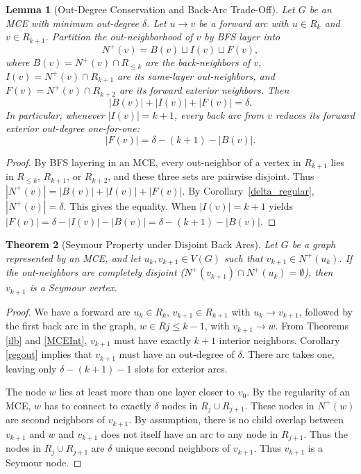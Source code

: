 \documentclass[AMS, Times1COL]{article} %
\newtheorem{theorem}{Theorem}[section]
\newtheorem{lemma}[theorem]{Lemma}
\theoremstyle{definition}
\begin{document}
	\begin{lemma}[Out-Degree Conservation and Back-Arc Trade-Off]
		\label{back_arc_tradeoff}
		Let $G$ be an MCE with minimum out-degree $\delta$. Let $u \to v$ be a forward arc with $u \in R_k$ and $v \in R_{k+1}$. Partition the out-neighborhood of $v$ by BFS layer into
		\[
		N^+(v) = B(v) \sqcup I(v) \sqcup F(v),
		\]
		where $B(v) = N^+(v) \cap R_{\le k}$ are the back-neighbors of $v$, $I(v) = N^+(v) \cap R_{k+1}$ are its same-layer out-neighbors, and $F(v) = N^+(v) \cap R_{k+2}$ are its forward exterior neighbors. Then
		\[
		|B(v)| + |I(v)| + |F(v)| = \delta.
		\]
		In particular, whenever $|I(v)| = k + 1$, every back arc from $v$ reduces its forward exterior out-degree one-for-one:
		\[
		|F(v)| = \delta - (k + 1) - |B(v)|.
		\]
	\end{lemma}
	
	\begin{proof}
		By BFS layering in an MCE, every out-neighbor of a vertex in $R_{k+1}$ lies in $R_{\le k}$, $R_{k+1}$, or $R_{k+2}$, and these three sets are pairwise disjoint. Thus $|N^+(v)| = |B(v)| + |I(v)| + |F(v)|$. By Corollary~\ref{delta_regular}, $|N^+(v)| = \delta$. This gives the equality. When $|I(v)| = k + 1$ yields $|F(v)| = \delta - |I(v)| - |B(v)| = \delta - (k + 1) - |B(v)|$.
	\end{proof}
	
	\begin{theorem}[Seymour Property under Disjoint Back Arcs]
		Let $G$ be a graph represented by an MCE, and let $u_k, v_{k+1} \in V(G)$ such that $v_{k+1} \in N^+(u_k)$. If the out-neighbors are completely disjoint ($N^+(v_{k+1}) \cap N^+(u_k) = \emptyset$), then $v_{k+1}$ is a  Seymour vertex. 
		\label{no_disc}
	\end{theorem}
	\begin{proof}
		We have a forward arc $u_k \in R_k$, $v_{k+1} \in R_{k+1}$ with $u_k \to v_{k+1}$, followed by the first back arc in the graph, $w \in R{j \le k-1}$, with $v_{k+1} \to w$. From Theorems \ref{ilb} and \ref{MCEInt}, $v_{k+1}$ must have exactly $k+1$ interior neighbors. Corollary \ref{regout} implies that $v_{k+1}$ must have an out-degree of $\delta$. There arc takes one, leaving only $\delta - (k+1) - 1$ slots for exterior arcs. 
		
		The node $w$ lies at least more than one layer closer to $v_0$. 
		By the regularity of an MCE, $w$ has to connect to exactly $\delta$ nodes in $R_j \cup R_{j+1}$. 
		These nodes in $N^+(w)$ are second neighbors of $v_{k+1}$. 
		By assumption, there is no child overlap between $v_{k+1}$ and $w$ and $v_{k+1}$ does not itself have an arc to any node in $R_{j+1}$. 
		Thus the nodes in $R_j \cup R_{j+1}$ are $\delta$ unique second neighbors of $v_{k+1}$. 
		Thus $v_{k+1}$ is a Seymour node.
	\end{proof}		
	
\end{document}
